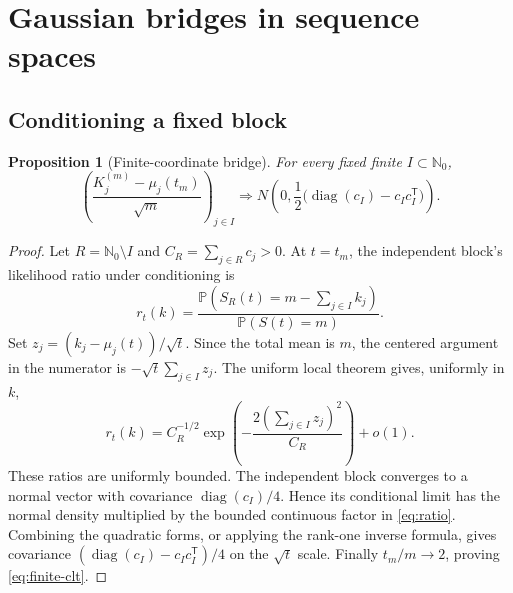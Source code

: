 \documentclass[11pt,a4paper]{article}
\numberwithin{equation}{section}
\newtheorem{proposition}[theorem]{Proposition}
\theoremstyle{definition}
\theoremstyle{remark}
\newcommand{\PP}{\mathbb P}
\newcommand{\N}{\mathbb N}
\newcommand{\diag}{\operatorname{diag}}
\begin{document}
\section{Gaussian bridges in sequence spaces}
\label{sec:bridges}

\subsection{Conditioning a fixed block}
\begin{proposition}[Finite-coordinate bridge]
\label{prop:finite-clt}
For every fixed finite $I\subset\N_0$,
\begin{equation}
\left(\frac{K_j^{(m)}-\mu_j(t_m)}{\sqrt m}\right)_{j\in I}
\Rightarrow N\left(0,\frac12\bigl(\diag(c_I)-c_Ic_I^{\mathsf T}\bigr)\right).
\label{eq:finite-clt}
\end{equation}
\end{proposition}
\begin{proof}
Let $R=\N_0\setminus I$ and $C_R=\sum_{j\in R}c_j>0$.
At $t=t_m$, the independent block's likelihood ratio under conditioning is
\[
r_t(k)=\frac{\PP(S_R(t)=m-\sum_{j\in I}k_j)}{\PP(S(t)=m)}.
\]
Set $z_j=(k_j-\mu_j(t))/\sqrt t$. Since the total mean is $m$,
the centered argument in the numerator is $-\sqrt t\sum_{j\in I}z_j$.
The uniform local theorem gives, uniformly in $k$,
\begin{equation}
r_t(k)=C_R^{-1/2}
\exp\left(-\frac{2(\sum_{j\in I}z_j)^2}{C_R}\right)+o(1).
\label{eq:ratio}
\end{equation}
These ratios are uniformly bounded. The independent block converges to a
normal vector with covariance $\diag(c_I)/4$. Hence its conditional limit
has the normal density multiplied by the bounded continuous factor in
\cref{eq:ratio}. Combining the quadratic forms, or applying the
rank-one inverse formula, gives covariance
$(\diag(c_I)-c_Ic_I^{\mathsf T})/4$ on the $\sqrt t$ scale.
Finally $t_m/m\to2$, proving \cref{eq:finite-clt}.
\end{proof}
\end{document}
